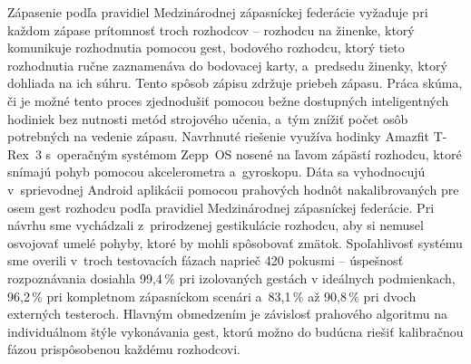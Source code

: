 Zápasenie podľa pravidiel Medzinárodnej zápasníckej
federácie vyžaduje pri každom zápase prítomnosť troch
rozhodcov -- rozhodcu na žinenke, ktorý komunikuje
rozhodnutia pomocou gest, bodového rozhodcu, ktorý tieto
rozhodnutia ručne zaznamenáva do bodovacej karty,
a~predsedu žinenky, ktorý dohliada na ich súhru. Tento
spôsob zápisu zdržuje priebeh zápasu. Práca skúma, či je možné tento proces zjednodušiť
pomocou bežne dostupných inteligentných hodiniek bez
nutnosti metód strojového učenia, a~tým znížiť počet osôb
potrebných na vedenie zápasu. Navrhnuté riešenie využíva
hodinky Amazfit T-Rex~3 s~operačným systémom Zepp~OS
nosené na ľavom zápästí rozhodcu, ktoré snímajú pohyb
pomocou akcelerometra a~gyroskopu. Dáta sa
vyhodnocujú v~sprievodnej Android aplikácii pomocou
prahových hodnôt nakalibrovaných pre osem gest
rozhodcu podľa pravidiel Medzinárodnej zápasníckej
federácie. Pri návrhu sme vychádzali z~prirodzenej
gestikulácie rozhodcu, aby si nemusel osvojovať umelé
pohyby, ktoré by mohli spôsobovať zmätok. 
Spoľahlivosť systému sme overili v~troch
testovacích fázach naprieč 420 pokusmi -- úspešnosť
rozpoznávania dosiahla 99,4\,\% pri izolovaných gestách
v ideálnych podmienkach,
96,2\,\% pri kompletnom zápasníckom scenári a~83,1\,\%
až 90,8\,\% pri dvoch externých testeroch. Hlavným
obmedzením je závislosť prahového algoritmu na
individuálnom štýle vykonávania gest, ktorú možno do
budúcna riešiť kalibračnou fázou prispôsobenou každému
rozhodcovi.